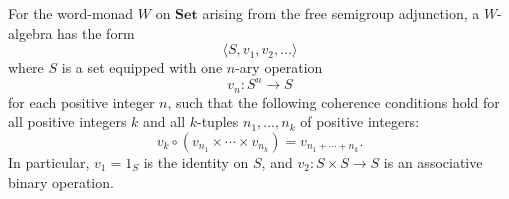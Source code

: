 For the word-monad $W$ on $\mathbf{Set}$ arising from the free semigroup adjunction, a $W$-algebra has the form
$$\langle S, v_1, v_2, \dots \rangle$$
where $S$ is a set equipped with one $n$-ary operation
$$v_n: S^n \to S$$
for each positive integer $n$, such that the following coherence conditions hold for all positive integers $k$ and all $k$-tuples $n_1, \dots, n_k$ of positive integers:
$$v_k \circ (v_{n_1} \times \cdots \times v_{n_k}) = v_{n_1 + \cdots + n_k}.$$
In particular, $v_1 = 1_S$ is the identity on $S$, and $v_2: S \times S \to S$ is an associative binary operation.
